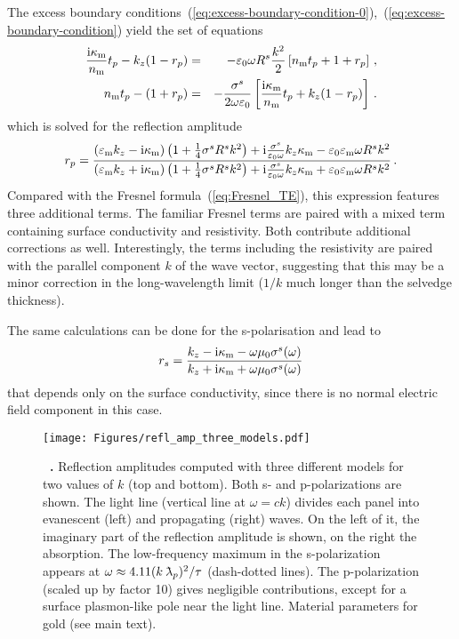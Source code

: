 \documentclass[11pt, oneside]{article}   	%
\newcommand{\lambdabar}{{\mkern+04mu\mathchar'26\mkern-09mu\lambda}}
\def\surconduct{{\sigma^s}}
\def\surresist{{R^s}}
\newcommand{\bulk}[1]{_{\mathrm{#1}}}
\renewcommand{\caption}[2][]{\refstepcounter{figure}%
\vspace*{1ex}\hspace*{8.5ex}%
\parbox{0.8\textwidth}{\small
\textbf{\figurename~\arabic{figure}.} #2}}
\begin{document}
The excess boundary conditions~(\ref{eq:excess-boundary-condition-0}),~(\ref{eq:excess-boundary-condition})
yield the set of equations
\begin{eqnarray}
\frac{ {\rm i} \kappa\bulk{m} }{ n\bulk{m} } t_p - k_z (1 - r_p) 
& = & -\varepsilon_0 \omega\surresist{} \frac{k^2}{2} \left[ n\bulk{m} t_p + 1 + r_p \right] 
\, ,\\
n\bulk{m} t_p  -  (1 +r_p) 
& = & - \frac{\surconduct}{2\omega\varepsilon_0} 
\left[ \frac{{\rm i} \kappa\bulk{m}}{n\bulk{m}} t_p + k_z (1-r_p) \right] 
\, .
\end{eqnarray}
which is solved for the reflection amplitude 
\begin{equation}
r_p = \frac{\left( \varepsilon\bulk{m} k_z - {\rm i}  \kappa\bulk{m} \right) \left( 1 + \frac{1}{4} \surconduct \surresist k^2 \right) + {\rm i} \frac{\surconduct}{\varepsilon_0 \omega} k_z \kappa\bulk{m} - \varepsilon_0 \varepsilon\bulk{m} \omega \surresist k^2}{\left( \varepsilon\bulk{m} k_z + {\rm i}  \kappa\bulk{m} \right) \left( 1 + \frac{1}{4} \surconduct\surresist k^2 \right) + {\rm i}\frac{\surconduct}{\varepsilon_0 \omega} k_z  \kappa\bulk{m} + \varepsilon_0 \varepsilon\bulk{m} \omega \surresist k^2} \label{eq:reflection_TM} \, .
\end{equation}
Compared with the Fresnel formula~(\ref{eq:Fresnel_TE}), 
this expression features three additional terms.
The familiar Fresnel terms are paired with a mixed term containing surface conductivity and resistivity. Both contribute additional corrections as well. Interestingly, the terms including the resistivity are paired with the parallel component $k$ of the wave vector, suggesting that
this may be a minor correction in the long-wavelength limit ($1/k$ much longer than the
selvedge thickness).

The same calculations can be done for the s-polarisation and lead to
\begin{equation}
r_s = \frac{k_z - {\rm i}  \kappa\bulk{m} - \omega\mu_0 \surconduct(\omega)}{k_z + {\rm i}  \kappa\bulk{m} + \omega\mu_0 \surconduct(\omega)}
\label{eq:reflection_TE}
\end{equation}
that depends only on the surface conductivity, since there is no normal electric field
component in this case.

\begin{figure}[bth]
\centerline{%
\texttt{[image: Figures/refl\_amp\_three\_models.pdf]}
}
\caption[]{Reflection amplitudes computed with three different models for two values of $k$ (top
and bottom). Both s- and p-polarizations are shown. The light line (vertical line at $\omega = c k$) divides each panel into evanescent (left) and propagating (right) waves. On the left of it, the imaginary part of the reflection amplitude is shown, on the right the absorption. 
The low-frequency maximum in the s-polarization appears at 
$\omega \approx 4.11 (k\lambdabar_p)^2 / \tau$ 
(dash-dotted lines). 
The p-polarization (scaled up by factor 10) gives negligible contributions, except for 
a surface plasmon-like pole near the light line. 
Material parameters for gold (see main text).}
\label{fig:overview-rs-rp}
\end{figure}
\end{document}
